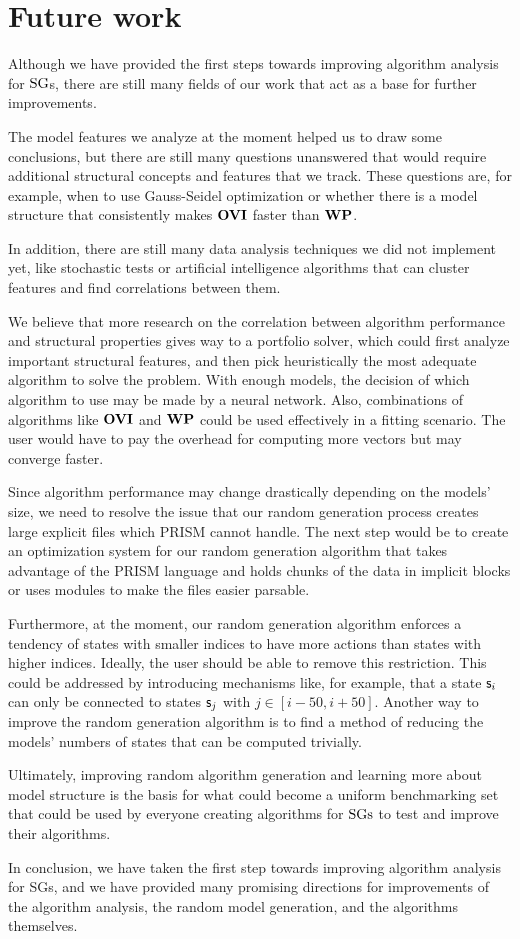 \section*{Future work}
Although we have provided the first steps towards improving algorithm analysis for $\textrm{SG}$s, 
there are still many fields of our work that act as a base for further improvements.

The model features we analyze at the moment helped us to draw some conclusions, but there are still many questions unanswered that would require
additional structural concepts and features that we track.
These questions are, for example, when to use Gauss-Seidel optimization or whether there is a model structure that consistently makes $\mathbf{OVI}$ faster than $\mathbf{WP}$.

In addition, there are still many data analysis techniques we did not implement yet, like stochastic tests or artificial intelligence algorithms
that can cluster features and find correlations between them. 

We believe that more research on the correlation between algorithm performance and structural properties gives way to a portfolio solver, which could first
analyze important structural features, and then pick heuristically the most adequate algorithm to solve the problem.
With enough models, the decision of which algorithm to use may be made by a neural network.
Also, combinations of algorithms like $\mathbf{OVI}$ and $\mathbf{WP}$ could be used effectively in a fitting scenario.
The user would have to pay the overhead for computing more vectors but may converge faster.

Since algorithm performance may change drastically depending on the models' size,
we need to resolve the issue that our random generation process creates large explicit files which PRISM cannot handle.
The next step would be to create an optimization system for our random generation algorithm that takes advantage of the PRISM language and holds chunks of the data in 
implicit blocks or uses modules to make the files easier parsable.

Furthermore, at the moment, our random generation algorithm enforces a tendency of states with smaller indices to have more actions than states with higher indices.
Ideally, the user should be able to remove this restriction.
This could be addressed by introducing mechanisms like, for example, that a state $\mathsf{s}_i$ can only be connected to states $\mathsf{s}_{j}$ with $j \in [i-50, i+50]$.
Another way to improve the random generation algorithm is to find a method of reducing the models' numbers of states that can be computed trivially.

Ultimately, improving random algorithm generation and learning more about model structure is the basis for what could become a uniform benchmarking set that could be used by everyone creating algorithms for $\textrm{SGs}$ to 
test and improve their algorithms.

In conclusion, we have taken the first step towards improving algorithm analysis for SGs, 
and we have provided many promising directions for improvements of the algorithm analysis, the random model generation, and the algorithms themselves.